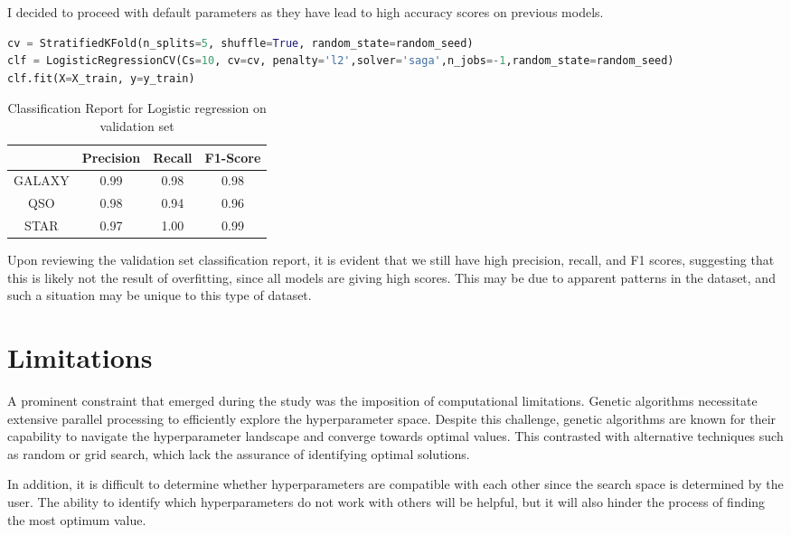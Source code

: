 I decided to proceed with default parameters as they have lead to high accuracy scores on previous models.

\begin{lstlisting}[language=Python, caption={Logistic Regression with default hyperparameters}, label={lst:Logreg}]
cv = StratifiedKFold(n_splits=5, shuffle=True, random_state=random_seed)
clf = LogisticRegressionCV(Cs=10, cv=cv, penalty='l2',solver='saga',n_jobs=-1,random_state=random_seed)
clf.fit(X=X_train, y=y_train)
\end{lstlisting}

\begin{table}[H]
\centering
\caption{Classification Report for Logistic regression on validation set}
\begin{tabular}{|c|c|c|c|}
\hline
& Precision & Recall & F1-Score \\
\hline
GALAXY & 0.99 & 0.98 & 0.98 \\
QSO & 0.98 & 0.94 & 0.96 \\
STAR & 0.97 & 1.00 & 0.99 \\
\hline
\end{tabular}
\end{table}

Upon reviewing the validation set classification report, it is evident that we still have high precision, recall, and F1 scores, suggesting that this is likely not the result of overfitting, since all models are giving high scores. This may be due to apparent patterns in the dataset, and such a situation may be unique to this type of dataset. 



\section{Limitations}


A prominent constraint that emerged during the study was the imposition of computational limitations. Genetic algorithms necessitate extensive parallel processing to efficiently explore the hyperparameter space. Despite this challenge, genetic algorithms are known for their capability to navigate the hyperparameter landscape and converge towards optimal values. This contrasted with alternative techniques such as random or grid search, which lack the assurance of identifying optimal solutions.

In addition, it is difficult to determine whether hyperparameters are compatible with each other since the search space is determined by the user. The ability to identify which hyperparameters do not work with others will be helpful, but it will also hinder the process of finding the most optimum value.